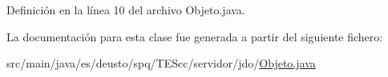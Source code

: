 Definición en la línea 10 del archivo Objeto.\+java.



La documentación para esta clase fue generada a partir del siguiente fichero\+:\begin{DoxyCompactItemize}
\item 
src/main/java/es/deusto/spq/\+T\+E\+Scc/servidor/jdo/\hyperlink{_objeto_8java}{Objeto.\+java}\end{DoxyCompactItemize}
